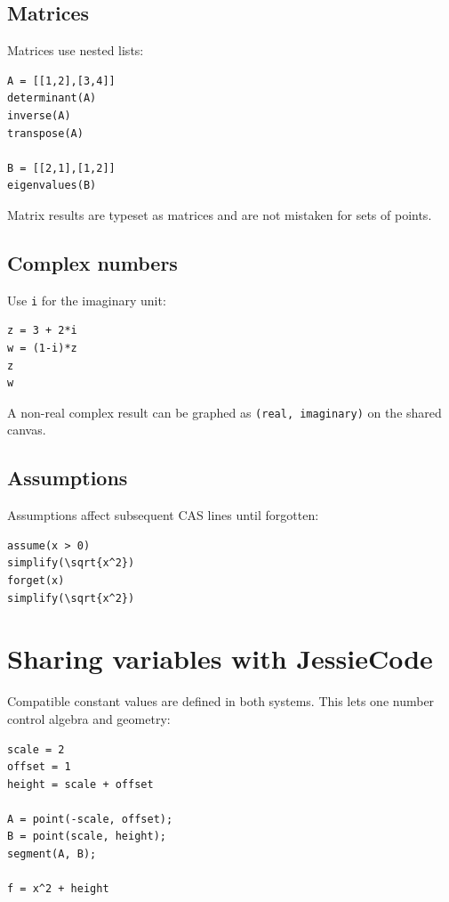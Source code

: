 \documentclass[11pt,a4paper]{article}
\newcommand{\code}[1]{\texttt{#1}}
\begin{document}
\subsection{Matrices}

Matrices use nested lists:

\begin{lstlisting}[style=jessie]
A = [[1,2],[3,4]]
determinant(A)
inverse(A)
transpose(A)

B = [[2,1],[1,2]]
eigenvalues(B)
\end{lstlisting}

Matrix results are typeset as matrices and are not mistaken for sets of points.

\subsection{Complex numbers}

Use \code{i} for the imaginary unit:

\begin{lstlisting}[style=jessie]
z = 3 + 2*i
w = (1-i)*z
z
w
\end{lstlisting}

A non-real complex result can be graphed as \code{(real, imaginary)} on the shared canvas.

\subsection{Assumptions}

Assumptions affect subsequent CAS lines until forgotten:

\begin{lstlisting}[style=jessie]
assume(x > 0)
simplify(\sqrt{x^2})
forget(x)
simplify(\sqrt{x^2})
\end{lstlisting}

\section{Sharing variables with JessieCode}

Compatible constant values are defined in both systems. This lets one number control algebra and geometry:

\begin{lstlisting}[style=jessie]
scale = 2
offset = 1
height = scale + offset

A = point(-scale, offset);
B = point(scale, height);
segment(A, B);

f = x^2 + height
\end{lstlisting}
\end{document}
